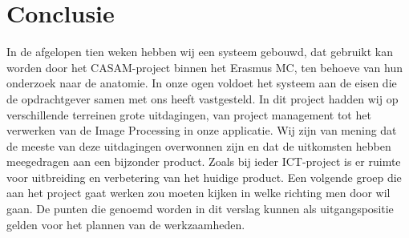 \section{Conclusie}
\label{Conclusie}
In de afgelopen tien weken hebben wij een systeem gebouwd, dat gebruikt kan worden door het CASAM-project binnen het Erasmus MC, ten behoeve van hun onderzoek naar de anatomie.
In onze ogen voldoet het systeem aan de eisen die de opdrachtgever samen met ons heeft vastgesteld. 
In dit project hadden wij op verschillende terreinen grote uitdagingen,
van project management tot het verwerken van de Image Processing in onze applicatie.
Wij zijn van mening dat de meeste van deze uitdagingen overwonnen zijn en dat de uitkomsten hebben meegedragen aan een bijzonder product. 
Zoals bij ieder ICT-project is er ruimte voor uitbreiding en verbetering van het huidige product.
Een volgende groep die aan het project gaat werken zou moeten kijken in welke richting men door wil gaan.
De punten die genoemd worden in dit verslag kunnen als uitgangspositie gelden voor het plannen van de werkzaamheden.

